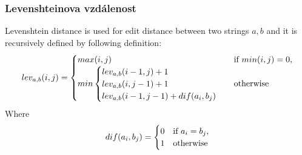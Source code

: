 \subsubsection{Levenshteinova vzdálenost} Levenshtein distance is used for edit distance between two strings $a, b$ and it is recursively defined by following definition:
\begin{equation*}
lev_{a,b}(i,j)=
\begin{cases}
max(i,j) & $if $ min(i,j)=0, \cr
min \begin{cases}
lev_{a,b}(i-1,j) + 1 \cr
lev_{a,b}(i,j-1) + 1 \cr
lev_{a,b}(i-1,j-1) + dif(a_i,b_j)
\end{cases} & $otherwise$
\end{cases}
\end{equation*}
Where \begin{equation*}
dif(a_i,b_j)=
\begin{cases}
0 & $if $ a_i = b_j, \cr
1 & $otherwise$
\end{cases}
\end{equation*}

